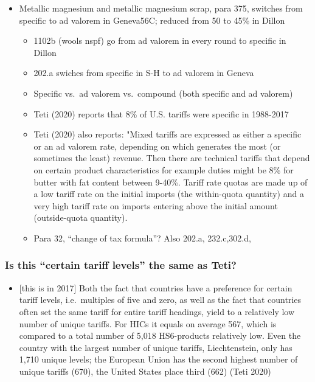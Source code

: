 \documentclass[
  12pt,
]{article}
\providecommand{\tightlist}{%
  \setlength{\itemsep}{0pt}\setlength{\parskip}{0pt}}
\begin{document}
\begin{itemize}
\item
  Metallic magnesium and metallic magnesium scrap, para 375, switches from specific to ad valorem in Geneva56C; reduced from 50 to 45\% in Dillon

  \begin{itemize}
  \item
    1102b (wools nspf) go from ad valorem in every round to specific in Dillon
  \item
    202.a swiches from specific in S-H to ad valorem in Geneva
  \item
    Specific vs.~ad valorem vs.~compound (both specific and ad valorem)
  \item
    Teti (2020) reports that 8\% of U.S. tariffs were specific in 1988-2017
  \item
    Teti (2020) also reports: "Mixed tariffs are expressed as either a specific or an ad valorem rate, depending on which generates the most (or sometimes the least) revenue. Then there are technical tariffs that depend on certain product characteristics for example duties might be 8\% for butter with fat content between 9-40\%. Tariff rate quotas are made up of a low tariff rate on the initial imports (the within-quota quantity) and a very high tariff rate on imports entering above the initial amount (outside-quota quantity).
  \item
    Para 32, ``change of tax formula''? Also 202.a, 232.c,302.d,
  \end{itemize}
\end{itemize}

\hypertarget{is-this-certain-tariff-levels-the-same-as-teti}{%
\subsubsection{Is this ``certain tariff levels'' the same as Teti?}\label{is-this-certain-tariff-levels-the-same-as-teti}}

\begin{itemize}
\tightlist
\item
  {[}this is in 2017{]} Both the fact that countries have a preference for certain tariff levels, i.e.~multiples of five and zero, as well as the fact that countries often set the same tariff for entire tariff headings, yield to a relatively low number of unique tariffs. For HICs it equals on average 567, which is compared to a total number of 5,018 HS6-products relatively low. Even the country with the largest number of unique tariffs, Liechtenstein, only has 1,710 unique levels; the European Union has the second highest number of unique tariffs (670), the United States place third (662) (Teti 2020)
\end{itemize}
\end{document}

